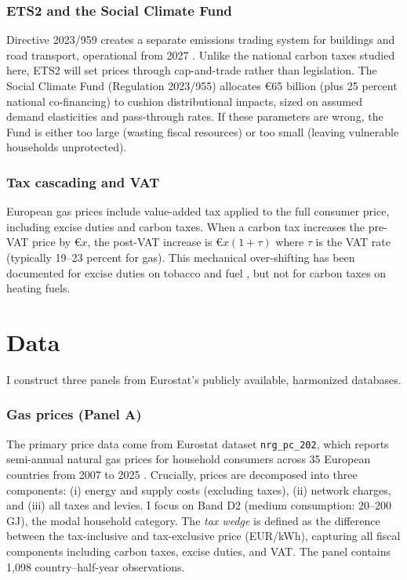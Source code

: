\documentclass[12pt]{article}
\begin{document}
\subsubsection*{ETS2 and the Social Climate Fund} Directive 2023/959 creates a separate emissions trading system for buildings and road transport, operational from 2027 \citep{european_commission_2021_fit55}. Unlike the national carbon taxes studied here, ETS2 will set prices through cap-and-trade rather than legislation. The Social Climate Fund (Regulation 2023/955) allocates \euro{}65 billion (plus 25 percent national co-financing) to cushion distributional impacts, sized on assumed demand elasticities and pass-through rates. If these parameters are wrong, the Fund is either too large (wasting fiscal resources) or too small (leaving vulnerable households unprotected).

\subsubsection*{Tax cascading and VAT} European gas prices include value-added tax applied to the full consumer price, including excise duties and carbon taxes. When a carbon tax increases the pre-VAT price by \euro{}$x$, the post-VAT increase is \euro{}$x(1+\tau)$ where $\tau$ is the VAT rate (typically 19--23 percent for gas). This mechanical over-shifting has been documented for excise duties on tobacco \citep{carbonnier2007vat} and fuel \citep{stolper2016incidence}, but not for carbon taxes on heating fuels.


\section{Data}
\label{sec:data}

I construct three panels from Eurostat's publicly available, harmonized databases.

\subsubsection*{Gas prices (Panel A)} The primary price data come from Eurostat dataset \texttt{nrg\_pc\_202}, which reports semi-annual natural gas prices for household consumers across 35 European countries from 2007 to 2025 \citep{eurostat_nrg_pc_202}. Crucially, prices are decomposed into three components: (i) energy and supply costs (excluding taxes), (ii) network charges, and (iii) all taxes and levies. I focus on Band D2 (medium consumption: 20--200 GJ), the modal household category. The \textit{tax wedge} is defined as the difference between the tax-inclusive and tax-exclusive price (EUR/kWh), capturing all fiscal components including carbon taxes, excise duties, and VAT. The panel contains 1,098 country--half-year observations.
\end{document}
